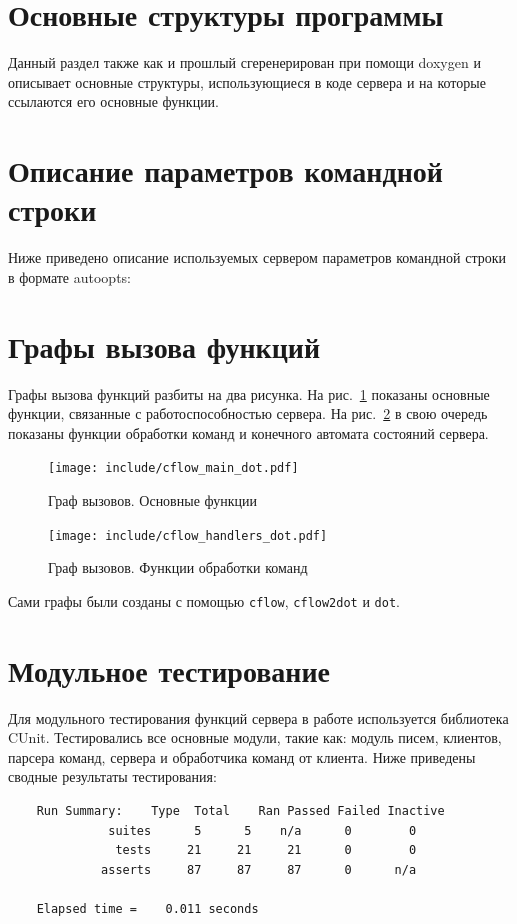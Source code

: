 \documentclass[a4paper,12pt]{report}
\begin{document}
\section{Основные структуры программы}

Данный раздел также как и прошлый сгеренерирован при помощи doxygen и описывает основные структуры, использующиеся в коде сервера и на которые ссылаются его основные функции.







\section{Описание параметров командной строки}

Ниже приведено описание используемых сервером параметров командной строки в формате autoopts:



\section{Графы вызова функций}

Графы вызова функций разбиты на два рисунка. На рис.~\ref{fig:cflow1} показаны основные функции, связанные с работоспособностью сервера. На рис.~\ref{fig:cflow2} в свою очередь показаны функции обработки команд и конечного автомата состояний сервера.

\begin{figure}[h]
\texttt{[image: include/cflow\_main\_dot.pdf]}
\caption{Граф вызовов. Основные функции}
\label{fig:cflow1}
\end{figure}

\begin{figure}
\centering
\texttt{[image: include/cflow\_handlers\_dot.pdf]}
\caption{Граф вызовов. Функции обработки команд}
\label{fig:cflow2}
\end{figure}

Сами графы были созданы с помощью \texttt{cflow}, \texttt{cflow2dot} и \texttt{dot}.


\section{Модульное тестирование}

Для модульного тестирования функций сервера в работе используется библиотека CUnit. Тестировались все основные модули, такие как: модуль писем, клиентов, парсера команд, сервера и обработчика команд от клиента. Ниже приведены сводные результаты тестирования:
\begin{verbatim}
    Run Summary:    Type  Total    Ran Passed Failed Inactive
              suites      5      5    n/a      0        0
               tests     21     21     21      0        0
             asserts     87     87     87      0      n/a

    Elapsed time =    0.011 seconds
\end{verbatim}
\end{document}
